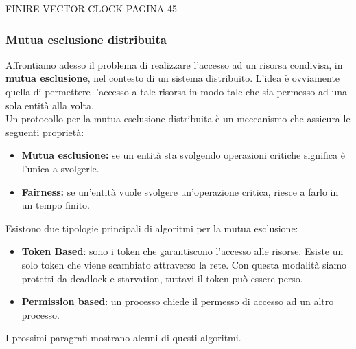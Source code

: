\documentclass[12pt]{article}
\begin{document}
    		FINIRE VECTOR CLOCK PAGINA 45
    		
    	\subsubsection{Mutua esclusione distribuita}
    		Affrontiamo adesso il problema di realizzare l'accesso ad un risorsa condivisa, in \textbf{mutua esclusione}, nel contesto di un sistema distribuito. L'idea è ovviamente quella di permettere l'accesso a tale risorsa in modo tale che sia permesso ad una sola entità alla volta.\\
    		Un protocollo per la mutua esclusione distribuita è un meccanismo che assicura le seguenti proprietà:
    		\begin{itemize}
    			\item \textbf{Mutua esclusione:} se un entità sta svolgendo operazioni critiche significa è l'unica a svolgerle.
    			\item \textbf{Fairness:} se un'entità vuole svolgere un'operazione critica, riesce a farlo in un tempo finito.
    		\end{itemize}
    		Esistono due tipologie principali di algoritmi per la mutua esclusione:
    		\begin{itemize}
    			\item \textbf{Token Based}: sono i token che garantiscono l'accesso alle risorse. Esiste un solo token che viene scambiato attraverso la rete. Con questa modalità siamo protetti da deadlock e starvation, tuttavi il token può essere perso.
    			\item \textbf{Permission based}: un processo chiede il permesso di accesso ad un altro processo.
    		\end{itemize}
    		I prossimi paragrafi mostrano alcuni di questi algoritmi.
    		
\end{document}
